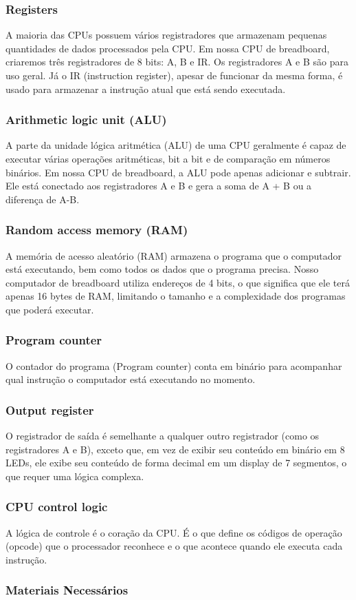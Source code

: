 \subsubsection{Registers}
A maioria das CPUs possuem vários registradores que armazenam pequenas quantidades de dados processados pela CPU. Em nossa CPU de breadboard, criaremos três registradores de 8 bits: A, B e IR. Os registradores A e B são para uso geral. Já o IR (instruction register), apesar de funcionar da mesma forma, é usado para armazenar a instrução atual que está sendo executada.

\subsubsection{Arithmetic logic unit (ALU)}
A parte da unidade lógica aritmética (ALU) de uma CPU geralmente é capaz de executar várias operações aritméticas, bit a bit e de comparação em números binários. Em nossa CPU de breadboard, a ALU pode apenas adicionar e subtrair. Ele está conectado aos registradores A e B e gera a soma de A + B ou a diferença de A-B.

\subsubsection{Random access memory (RAM)}
A memória de acesso aleatório (RAM) armazena o programa que o computador está executando, bem como todos os dados que o programa precisa. Nosso computador de breadboard utiliza endereços de 4 bits, o que significa que ele terá apenas 16 bytes de RAM, limitando o tamanho e a complexidade dos programas que poderá executar.

\subsubsection{Program counter}
O contador do programa (Program counter) conta em binário para acompanhar qual instrução o computador está executando no momento.

\subsubsection{Output register}
O registrador de saída é semelhante a qualquer outro registrador (como os registradores A e B), exceto que, em vez de exibir seu conteúdo em binário em 8 LEDs, ele exibe seu conteúdo de forma decimal em um display de 7 segmentos, o que requer uma lógica complexa.

\subsubsection{CPU control logic}
A lógica de controle é o coração da CPU. É o que define os códigos de operação (opcode) que o processador reconhece e o que acontece quando ele executa cada instrução.

\subsubsection{Materiais Necessários}

\newpage


